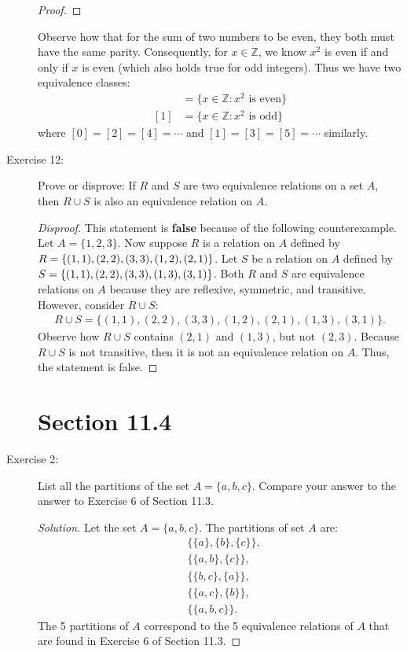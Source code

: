 \documentclass[12pt]{article}
\begin{document}
\begin{description}
\begin{spacing}{2}
\begin{proof}
\end{proof}
Observe how that for the sum of two numbers to be even, they both must have the same parity. Consequently, for $x \in \mathbb{Z}$, we know $x^2$ is even if and only if $x$ is even (which also holds true for odd integers). Thus we have two equivalence classes:
\begin{align*}
    [0] &= \{x \in \mathbb{Z} : x^2 \text{ is even}\} \\
    [1] &= \{x \in \mathbb{Z} : x^2 \text{ is odd}\}
\end{align*}
where $[0] = [2] = [4] = \cdots$ and $[1] = [3] = [5] = \cdots$ similarly.
\end{spacing}
\item[Exercise 12:] Prove or disprove: If $R$ and $S$ are two equivalence relations on a set $A$, then $R \cup S$ is also an equivalence relation on $A$.
\begin{spacing}{2}
\begin{proof}[Disproof]
This statement is \textbf{false} because of the following counterexample.
\newline
Let $A = \{1,2,3\}$. Now suppose $R$ is a relation on $A$ defined by $R = \{(1,1),(2,2),
\newline 
(3,3),(1,2),(2,1)\}$. Let $S$ be a relation on $A$ defined by $S = \{(1,1),(2,2), (3,3),
\newline
(1,3),(3,1)\}$. Both $R$ and $S$ are equivalence relations on $A$ because they are reflexive, symmetric, and transitive. However, consider $R \cup S$:
\begin{align*}
    R \cup S = \{(1,1),(2,2),(3,3),(1,2),(2,1),(1,3),(3,1)\}.
\end{align*}
Observe how $R \cup S$ contains $(2,1)$ and $(1,3)$, but not $(2,3)$. Because $R \cup S$ is not transitive, then it is not an equivalence relation on $A$. Thus, the statement is false.
\end{proof}
\end{spacing} 
\section*{Section 11.4}
\item[Exercise 2:] List all the partitions of the set $A = \{a,b,c\}$. Compare your answer to the answer to Exercise 6 of Section 11.3.
\begin{spacing}{2}
\begin{proof}[Solution]
Let the set $A = \{a,b,c\}$. The partitions of set $A$ are:
\begin{align*}
    &\Big\{\{a\},\{b\},\{c\}\Big\}, \\
    &\Big\{\{a,b\},\{c\}\Big\}, \\
    &\Big\{\{b,c\},\{a\}\Big\}, \\
    &\Big\{\{a,c\},\{b\}\Big\}, \\
    &\Big\{\{a,b,c\}\Big\}.
\end{align*}
The 5 partitions of $A$ correspond to the 5 equivalence relations of $A$ that are found in Exercise 6 of Section 11.3.
\end{proof}
\end{spacing} 
\end{description}
\end{document}
